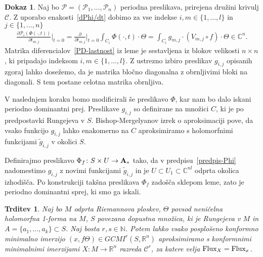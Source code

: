 \documentclass[12pt,a4paper,twoside]{article}
\theoremstyle{definition} %
\newtheorem{dokaz}{Dokaz}
\theoremstyle{plain} %
\newtheorem{trditev}[definicija]{Trditev}
\numberwithin{equation}{section}  %
\newcommand{\R}{\mathbb R}
\newcommand{\N}{\mathbb N}
\newcommand{\C}{\mathbb C}
\begin{document}
\begin{dokaz}
Naj bo $\mathcal{P} = (\mathcal{P}_{1}, \dots, \mathcal{P}_{n})$ periodna preslikava, prirejena družini krivulj $\mathcal{C}$. Z uporabo enakosti~\ref{dPhi/dt} dobimo za vse indekse $i, m \in \{1, \dots, l \}$ in $j \in \{1, \dots, n \}$
\begin{align}
\frac{\partial \mathcal{P}_{i}(\Phi(\cdot, t))}{\partial t_{m,j}} \Big|_{t=0} = \frac{\partial}{\partial t_{m,j}} \Big|_{t=0} \int_{C_{i}} \Phi(\cdot, t) \cdot \Theta = \int_{C_{i}} g_{m,j} \cdot (V_{m,j} \circ f) \cdot \Theta \in \C^{n}.
\end{align}
Matrika diferencialov~\ref{PD-lastnost} iz leme je sestavljena iz blokov velikosti $n \times n$, ki pripadajo indeksom $i, m \in \{1, \dots, l \}$. Z ustrezno izbiro preslikav $g_{i,j}$ opisanih zgoraj lahko dosežemo, da je matrika bločno diagonalna z obrnljivimi bloki na diagonali. S tem postane celotna matrika obrnljiva.

V naslednjem koraku bomo modificirali še preslikavo $\Phi$, kar nam bo dalo iskani periodno dominantni prej.
Preslikave $g_{i,j}$ so definirane na množici $C$, ki je po predpostavki Rungejeva v $S$. Bishop-Mergelyanov izrek o aproksimaciji pove, da vsako funkcijo $g_{i,j}$ lahko enakomerno na $C$ aproksimiramo s holomorfnimi funkcijami $\tilde{g}_{i,j}$ v okolici $S$.

Definirajmo preslikavo $\Phi_{f} \colon S \times U \to \textbf{\textup{A}}_{*}$ tako, da v predpisu~\ref{predpis-Phi} nadomestimo $g_{i,j}$ z novimi funkcijami $\tilde{g}_{i,j}$ in je $U \subset U_{1} \subset \C^{nl}$ odprta okolica izhodišča. Po konstrukciji takšna preslikava $\Phi_{f}$ zadošča sklepom leme, zato je periodno dominantni sprej, ki smo ga iskali.
\end{dokaz}

\begin{trditev}
Naj bo $M$ odprta Riemannova ploskev, $\Theta$ povsod neničelna holomorfna 1-forma na $M$, $S$ povezana dopustna množica, ki je Rungejeva v $M$ in $A=\{a_{1}, \dots , a_{k} \} \subset S$. Naj bosta $r, s \in \N$. 
Potem lahko vsako posplošeno konformno minimalno imerzijo $(x, f\Theta) \in GCMI^{r}(S,\R^{n})$ aproksimiramo s konformnimi minimalnimi imerzijami $X \colon M \to \R^{n}$ razreda $\mathcal{C}^{r}$, za katere velja $\textup{Flux}_{X} = \textup{Flux}_{x}$. 
\end{trditev}
\end{document}
